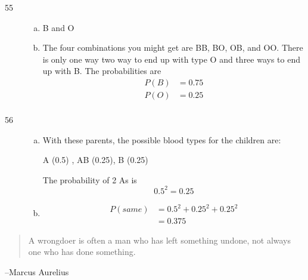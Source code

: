 \documentclass[letterpaper, landscape]{exam}
\begin{document}
\begin{description}
    \item[55]
      \begin{enumerate}[(a)]
        \item B and O

        \item
          The four combinations you might get are BB, BO, OB, and OO. There is
          only one way two way to end up with type O and three ways to end up
          with B. The probabilities are
          \begin{align*}
            P(B) & = 0.75 \\
            P(O) & = 0.25 \\
          \end{align*}
      \end{enumerate}

    \item[56]
      \begin{enumerate}[(a)]
        \item 
          With these parents, the possible blood types for the children are: 
          
          A (0.5) , AB (0.25), B (0.25)

          The probability of 2 As is 
          \[
            0.5^2 = \boxed{ 0.25 }
          \]

        \item 
          \begin{align*}
            P(same) & = 0.5^2 + 0.25^2 + 0.25^2 \\
                    & = \boxed{ 0.375 }
          \end{align*}
      \end{enumerate}
  \end{description}

  \else
    \vspace{11 cm}
    \begin{quote}
      \begin{em}
        A wrongdoer is often a man who has left something undone, not always one
        who has done something.
      \end{em}
    \end{quote}
    \hspace{1 cm}--Marcus Aurelius
  \fi
\end{document}
